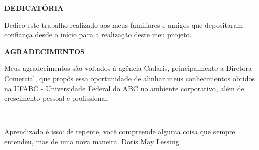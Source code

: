 \documentclass[
  12pt,				%
  openany,
  oneside,
  a4paper,			%
  english,			%
  brazil
]{article}
\numberwithin{figure}{section}
\numberwithin{table}{section}
\begin{document}

\begin{titlepage}

\begin{center}
\textbf{DEDICATÓRIA}
\end{center}

Dedico este trabalho realizado aos meus familiares e amigos que depositaram confiança desde o início para a realização deste meu projeto.

\end{titlepage}


\begin{titlepage}

\begin{center}
\textbf{AGRADECIMENTOS}
\end{center}

Meus agradecimentos são voltados à agência Cadaris, principalmente a Diretora Comercial, que propôs essa oportunidade de alinhar meus conhecimentos obtidos na UFABC - Universidade Federal do ABC no ambiente corporativo, além de crescimento pessoal e profissional.

\end{titlepage}


\begin{titlepage}
~\\\vspace{18cm}
\begin{raggedleft}

\begin{epigraph} 
  {Aprendizado é isso: de repente, você compreende alguma coisa que sempre entendeu, mas de uma nova maneira.}
  {Doris May Lessing}
\end{epigraph}

\end{raggedleft}

\end{titlepage}

\end{document}
